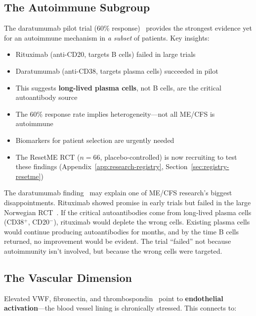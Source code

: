 \subsection{The Autoimmune Subgroup}

The daratumumab pilot trial (60\% response)~\cite{Fluge2025daratumumab} provides the strongest evidence yet for an autoimmune mechanism in \textit{a subset} of patients. Key insights:

\begin{itemize}
    \item Rituximab (anti-CD20, targets B cells) failed in large trials~\cite{Fluge2019}
    \item Daratumumab (anti-CD38, targets plasma cells) succeeded in pilot~\cite{Fluge2025daratumumab}
    \item This suggests \textbf{long-lived plasma cells}, not B cells, are the critical autoantibody source
    \item The 60\% response rate implies heterogeneity---not all ME/CFS is autoimmune
    \item Biomarkers for patient selection are urgently needed
    \item The ResetME RCT ($n=66$, placebo-controlled) is now recruiting to test these findings (Appendix~\ref{app:research-registry}, Section~\ref{sec:registry-resetme})
\end{itemize}

\begin{observation}
The daratumumab finding~\cite{Fluge2025daratumumab} may explain one of ME/CFS research's biggest disappointments. Rituximab showed promise in early trials but failed in the large Norwegian RCT~\cite{Fluge2019}. If the critical autoantibodies come from long-lived plasma cells (CD38$^+$, CD20$^-$), rituximab would deplete the wrong cells. Existing plasma cells would continue producing autoantibodies for months, and by the time B cells returned, no improvement would be evident. The trial ``failed'' not because autoimmunity isn't involved, but because the wrong cells were targeted.
\end{observation}

\subsection{The Vascular Dimension}

Elevated VWF, fibronectin, and thrombospondin~\cite{heng2025mecfs} point to \textbf{endothelial activation}---the blood vessel lining is chronically stressed. This connects to:

